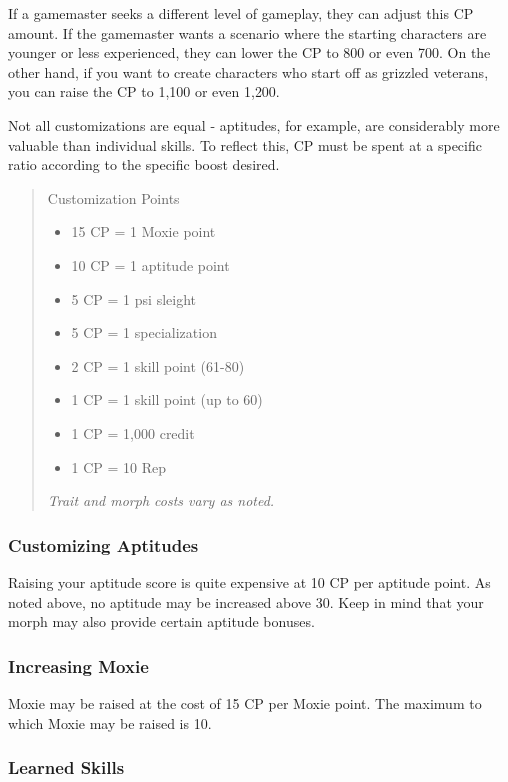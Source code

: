 If a gamemaster seeks a different level of gameplay, they can adjust this CP amount. If the gamemaster wants a scenario where the starting characters are younger or less experienced, they can lower the CP to 800 or even 700. On the other hand, if you want to create characters who start off as grizzled veterans, you can raise the CP to 1,100 or even 1,200. 

Not all customizations are equal - aptitudes, for example, are considerably more valuable than individual skills. To reflect this, CP must be spent at a specific ratio according to the specific boost desired. 

\begin{quotation} Customization Points \begin{itemize} \item 15 CP = 1 Moxie point \item 10 CP = 1 aptitude point \item 5 CP = 1 psi sleight \item 5 CP = 1 specialization \item 2 CP = 1 skill point (61-80) \item 1 CP = 1 skill point (up to 60) \item 1 CP = 1,000 credit \item 1 CP = 10 Rep \end{itemize} \textit{Trait and morph costs vary as noted.} \end{quotation} 

\subsubsection{Customizing Aptitudes} \label{sec:customizing-aptitudes} 

Raising your aptitude score is quite expensive at 10 CP per aptitude point. As noted above, no aptitude may be increased above 30. Keep in mind that your morph may also provide certain aptitude bonuses. 

\subsubsection{Increasing Moxie} \label{sec:increasing-moxie} 

Moxie may be raised at the cost of 15 CP per Moxie point. The maximum to which Moxie may be raised is 10. 

\subsubsection{Learned Skills} \label{sec:buying-learned-skills} 

